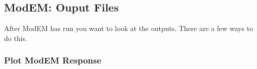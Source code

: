 \subsection{ModEM: Ouput Files}
\label{sec:modeling.modem.output}

After ModEM has run you want to look at the outputs.  There are a few ways to do this.  

\subsubsection{Plot ModEM Response}
\label{sec:modeling.modem.plot_response}



